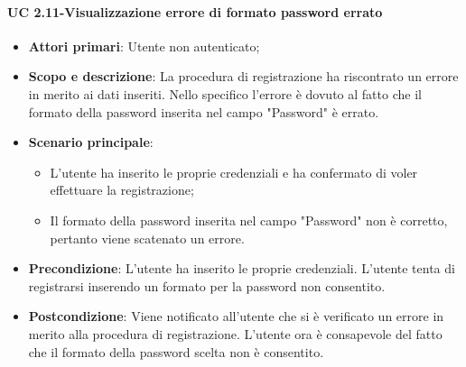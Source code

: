         \paragraph{UC 2.11-Visualizzazione errore di formato password errato}
            \begin{itemize}
                \item \textbf{Attori primari}: Utente non autenticato;
               
                \item \textbf{Scopo e descrizione}: La procedura di registrazione ha riscontrato un errore in merito ai
                dati inseriti. Nello specifico l'errore è dovuto al fatto che il formato della password inserita nel campo "Password" è errato. 
                \item \textbf{Scenario principale}: 
                    \begin{itemize}
                        \item L'utente ha inserito le proprie credenziali e ha confermato di voler effettuare la registrazione;
                        \item Il formato della password inserita nel campo "Password" non è corretto, pertanto viene scatenato un errore.
                    \end{itemize}
                \item \textbf{Precondizione}: L'utente ha inserito le proprie credenziali. L'utente tenta di registrarsi inserendo un formato per la password non consentito.
                 \item \textbf{Postcondizione}: Viene notificato all'utente che si è verificato un errore in merito
                alla procedura di registrazione. L'utente ora è consapevole del fatto che il formato della password scelta non è consentito.
            \end{itemize}
            
            
            
